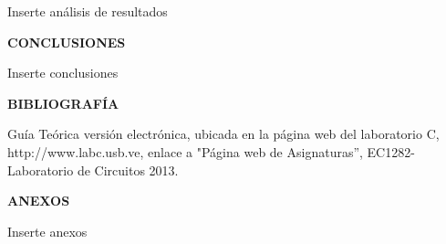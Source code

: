 \documentclass[12pt]{article}
\begin{document}
	Inserte análisis de resultados
	
	\newpage
	
	\begin{center}
		\textbf{\large CONCLUSIONES}\\
	\end{center}
	
	Inserte conclusiones
	
	\newpage
	
	\begin{center}
		\textbf{\large BIBLIOGRAFÍA}\\
	\end{center}
	
	\noindent Guía Teórica versión electrónica, ubicada en la página web del laboratorio C, http://www.labc.usb.ve,
	enlace a "Página web de Asignaturas”, EC1282- Laboratorio de Circuitos 2013.
	
	\newpage
	
	\begin{center}
		\textbf{\large ANEXOS}\\
	\end{center}
	
	Inserte anexos
	
\end{document}
